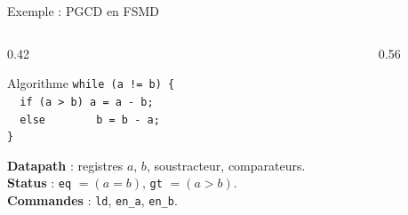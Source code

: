 \begin{frame}{Exemple : PGCD en FSMD}
  \begin{columns}[T]
    \begin{column}{0.42\textwidth}
\begin{block}{Algorithme}
\small
\texttt{while (a != b) \{}\\
\texttt{~~if (a > b) a = a - b;}\\
\texttt{~~else~~~~~~~~b = b - a;}\\
\texttt{\}}
\end{block}
      \small
      \textbf{Datapath} : registres $a$, $b$, soustracteur, comparateurs.\\[1mm]
      \textbf{Status} : \texttt{eq} $=(a=b)$, \texttt{gt} $=(a>b)$.\\
      \textbf{Commandes} : \texttt{ld}, \texttt{en\_a}, \texttt{en\_b}.
    \end{column}
    \begin{column}{0.56\textwidth}
      \centering
    \end{column}
  \end{columns}
\end{frame}

